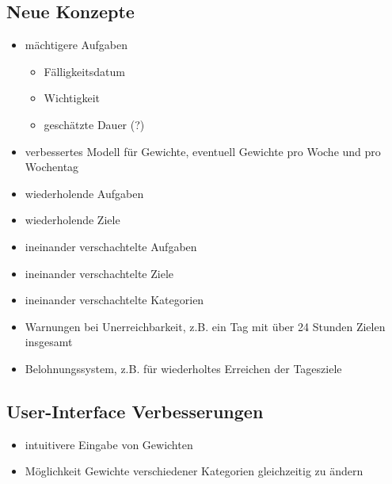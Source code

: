 \documentclass[10pt,a4paper]{article}
\begin{document}
\subsection{Neue Konzepte}
\begin{itemize}
	\item mächtigere Aufgaben
	\begin{itemize}
		\item Fälligkeitsdatum
		\item Wichtigkeit
		\item geschätzte Dauer (?)
	\end{itemize}
	\item verbessertes Modell für Gewichte, eventuell Gewichte pro Woche und pro Wochentag
	\item wiederholende Aufgaben
	\item wiederholende Ziele
	\item ineinander verschachtelte Aufgaben
	\item ineinander verschachtelte Ziele
	\item ineinander verschachtelte Kategorien
	\item Warnungen bei Unerreichbarkeit, z.B. ein Tag mit über 24 Stunden Zielen insgesamt
	\item Belohnungssystem, z.B. für wiederholtes Erreichen der Tagesziele
\end{itemize}
\subsection{User-Interface Verbesserungen}
\begin{itemize}
	\item intuitivere Eingabe von Gewichten
	\item Möglichkeit Gewichte verschiedener Kategorien gleichzeitig zu ändern
\end{itemize}
\end{document}
